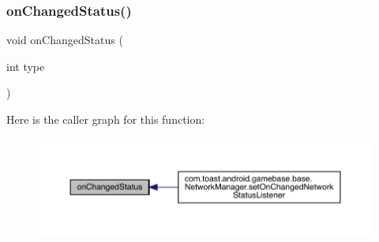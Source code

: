 \subsubsection{\texorpdfstring{on\+Changed\+Status()}{onChangedStatus()}}
{\footnotesize\ttfamily void on\+Changed\+Status (\begin{DoxyParamCaption}\item[{int}]{type }\end{DoxyParamCaption})}

Here is the caller graph for this function\+:
\nopagebreak
\begin{figure}[H]
\begin{center}
\leavevmode
\includegraphics[width=350pt]{interfacecom_1_1toast_1_1android_1_1gamebase_1_1base_1_1_network_manager_1_1_on_changed_status_listener_a9957c950680176bee859390555ba2301_icgraph}
\end{center}
\end{figure}
